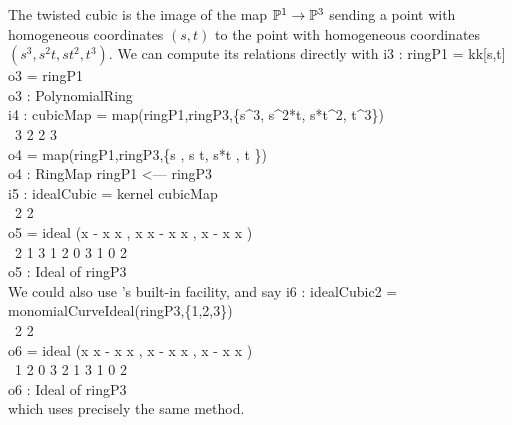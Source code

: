 The twisted cubic is the image of the map $\P^1\to\P^3$ sending
a point with homogeneous coordinates $(s,t)$ to the point with
homogeneous coordinates $(s^3, s^2t, st^2, t^3)$. We can compute
its relations directly with
\beginOutput
i3 : ringP1 = kk[s,t]\\
\emptyLine
o3 = ringP1\\
\emptyLine
o3 : PolynomialRing\\
\endOutput
\beginOutput
i4 : cubicMap = map(ringP1,ringP3,\{s^3, s^2*t, s*t^2, t^3\})\\
\emptyLine
\                         3   2      2   3\\
o4 = map(ringP1,ringP3,\{s , s t, s*t , t \})\\
\emptyLine
o4 : RingMap ringP1 <--- ringP3\\
\endOutput
{}%
\beginOutput
i5 : idealCubic = kernel cubicMap\\
\emptyLine
\             2                       2\\
o5 = ideal (x  - x x , x x  - x x , x  - x x )\\
\             2    1 3   1 2    0 3   1    0 2\\
\emptyLine
o5 : Ideal of ringP3\\
\endOutput
We could also use \Mtwo's built-in facility, and say
\beginOutput
i6 : idealCubic2 = monomialCurveIdeal(ringP3,\{1,2,3\})\\
\emptyLine
\                          2          2\\
o6 = ideal (x x  - x x , x  - x x , x  - x x )\\
\             1 2    0 3   2    1 3   1    0 2\\
\emptyLine
o6 : Ideal of ringP3\\
\endOutput
which uses precisely the same method.

